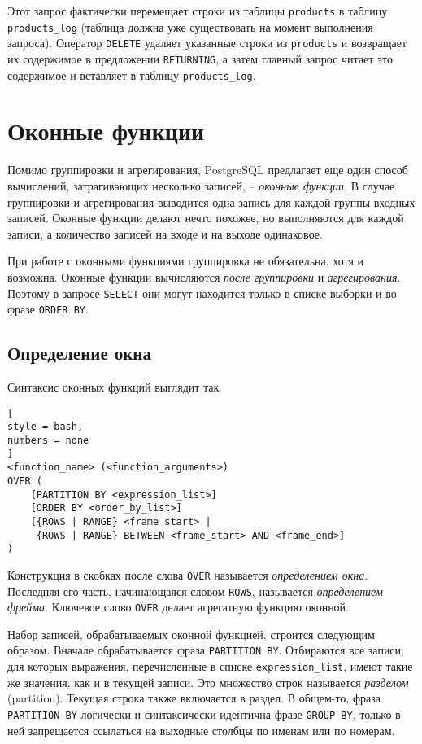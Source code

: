 \documentclass[%
	11pt,
	a4paper,
	utf8,
		]{article}
\begin{document}
Этот запрос фактически перемещает строки из таблицы \texttt{products} в таблицу \texttt{products\_log} (таблица должна уже существовать на момент выполнения запроса). Оператор \texttt{DELETE} удаляет указанные строки из \texttt{products} и возвращает их содержимое в предложении \texttt{RETURNING}, а затем главный запрос читает это содержимое и вставляет в таблицу \texttt{products\_log}.

\section{Оконные функции}

Помимо группировки и агрегирования, PostgreSQL предлагает еще один способ вычислений, затрагивающих несколько записей, -- \emph{оконные функции}. В случае группировки и агрегирования выводится одна запись для каждой группы входных записей. Оконные функции делают нечто похожее, но выполняются для каждой записи, а количество записей на входе и на выходе одинаковое.

При работе с оконными функциями группировка не обязательна, хотя и возможна. Оконные функции вычисляются \emph{после группировки} и \emph{агрегирования}. Поэтому в запросе \texttt{SELECT} они могут находится только в списке выборки и во фразе \texttt{ORDER BY}.

\subsection{Определение окна}

Синтаксис оконных функций выглядит так
\begin{lstlisting}[
style = bash,
numbers = none
]
<function_name> (<function_arguments>)
OVER (
    [PARTITION BY <expression_list>]
    [ORDER BY <order_by_list>]
    [{ROWS | RANGE} <frame_start> |
     {ROWS | RANGE} BETWEEN <frame_start> AND <frame_end>]
)
\end{lstlisting}

Конструкция в скобках после слова \texttt{OVER} называется \emph{определением окна}. Последняя его часть, начинающаяся словом \texttt{ROWS}, называется \emph{определением фрейма}. Ключевое слово \texttt{OVER} делает агрегатную функцию оконной.

Набор записей, обрабатываемых оконной функцией, строится следующим образом. Вначале обрабатывается фраза \texttt{PARTITION BY}. Отбираются все записи, для которых выражения, перечисленные в списке \texttt{expression\_list}, имеют такие же значения, как и в текущей записи. Это множество строк называется \emph{разделом} (partition). Текущая строка также включается в раздел. В общем-то, фраза \texttt{PARTITION BY} логически и синтаксически идентична фразе \texttt{GROUP BY}, только в ней запрещается ссылаться на выходные столбцы по именам или по номерам.
\end{document}
